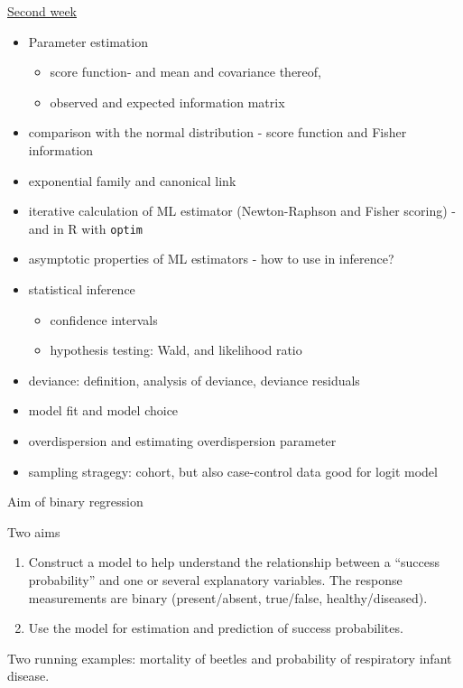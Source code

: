\documentclass[
  ignorenonframetext,
]{beamer}
\providecommand{\tightlist}{%
  \setlength{\itemsep}{0pt}\setlength{\parskip}{0pt}}
\begin{document}
\begin{frame}[fragile]
\begin{block}{\protect\hyperlink{secondweek}{Second week}}
\protect\hypertarget{second-week}{}
\begin{itemize}
\tightlist
\item
  Parameter estimation

  \begin{itemize}
  \tightlist
  \item
    score function- and mean and covariance thereof,
  \item
    observed and expected information matrix
  \end{itemize}
\item
  comparison with the normal distribution - score function and Fisher
  information
\item
  exponential family and canonical link
\item
  iterative calculation of ML estimator (Newton-Raphson and Fisher
  scoring) - and in R with \texttt{optim}
\item
  asymptotic properties of ML estimators - how to use in inference?
\item
  statistical inference

  \begin{itemize}
  \tightlist
  \item
    confidence intervals
  \item
    hypothesis testing: Wald, and likelihood ratio
  \end{itemize}
\item
  deviance: definition, analysis of deviance, deviance residuals
\item
  model fit and model choice
\item
  overdispersion and estimating overdispersion parameter
\item
  sampling stragegy: cohort, but also case-control data good for logit
  model
\end{itemize}
\end{block}
\end{frame}

\begin{frame}{Aim of binary regression}
\protect\hypertarget{aim-of-binary-regression}{}
\begin{block}{Two aims}
\protect\hypertarget{two-aims}{}
\begin{enumerate}
\tightlist
\item
  Construct a model to help understand the relationship between a
  ``success probability'' and one or several explanatory variables. The
  response measurements are binary (present/absent, true/false,
  healthy/diseased).
\item
  Use the model for estimation and prediction of success probabilites.
\end{enumerate}

Two running examples: mortality of beetles and probability of
respiratory infant disease.
\end{block}
\end{frame}
\end{document}

